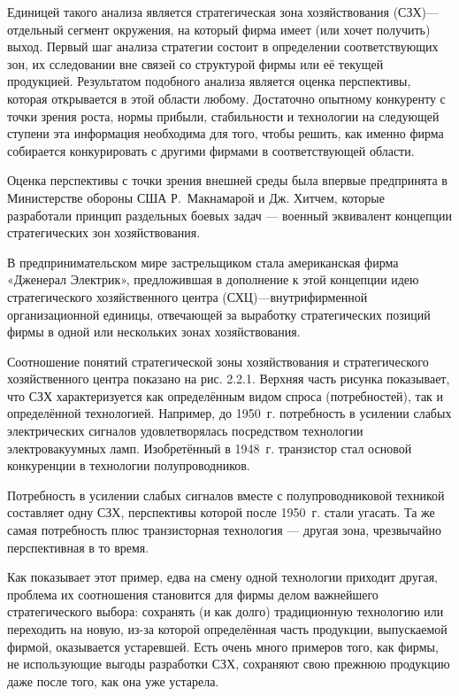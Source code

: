 Единицей такого анализа является стратегическая зона хозяйствования (СЗХ)—отдельный сегмент окружения, на который фирма имеет (или хочет получить) выход. Первый шаг анализа стратегии состоит в определении соответствующих зон, их сследовании вне связей со структурой фирмы или её текущей продукцией. Результатом подобного анализа является оценка перспективы, которая открывается в этой области любому. Достаточно опытному конкуренту с точки зрения роста, нормы прибыли, стабильности и технологии на следующей ступени эта информация необходима для того, чтобы решить, как именно фирма собирается конкурировать с другими фирмами в соответствующей области.

Оценка перспективы с точки зрения внешней среды была впервые предпринята в Министерстве обороны США Р. Макнамарой и Дж. Хитчем, которые разработали принцип раздельных боевых задач — военный эквивалент концепции стратегических зон хозяйствования.

В предпринимательском мире застрельщиком стала американская фирма «Дженерал Электрик», предложившая в дополнение к этой концепции идею стратегического хозяйственного центра (СХЦ)—внутрифирменной организационной единицы, отвечающей за выработку стратегических позиций фирмы в одной или нескольких зонах хозяйствования.

Соотношение понятий стратегической зоны хозяйствования и стратегического хозяйственного центра показано на рис. 2.2.1. Верхняя часть рисунка показывает, что СЗХ характеризуется как определённым видом спроса (потребностей), так и определённой технологией. Например, до 1950 г. потребность в усилении слабых электрических сигналов удовлетворялась посредством технологии электровакуумных ламп. Изобретённый в 1948 г. транзистор стал основой конкуренции в технологии полупроводников.

Потребность в усилении слабых сигналов вместе с полупроводниковой техникой составляет одну СЗХ, перспективы которой после 1950 г. стали угасать. Та же самая потребность плюс транзисторная технология — другая зона, чрезвычайно перспективная в то время.

Как показывает этот пример, едва на смену одной технологии приходит другая, проблема их соотношения становится для фирмы делом важнейшего стратегического выбора: сохранять (и как долго) традиционную технологию или переходить на новую, из-за которой определённая часть продукции, выпускаемой фирмой, оказывается устаревшей. Есть очень много примеров того, как фирмы, не использующие выгоды разработки СЗХ, сохраняют свою прежнюю продукцию даже после того, как она уже устарела.

